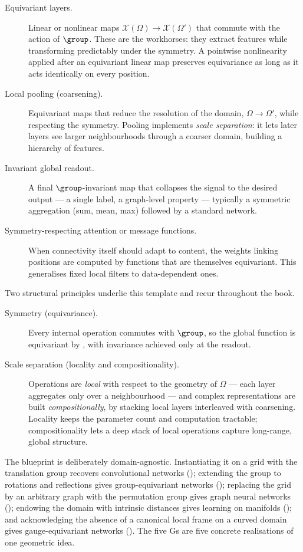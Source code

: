 \begin{description}
\item[Equivariant layers.] Linear or nonlinear maps
$\mathcal{X}(\Omega) \to \mathcal{X}(\Omega')$ that commute with the action of
$\group$. These are the workhorses: they extract features while transforming
predictably under the symmetry. A pointwise nonlinearity applied after an
equivariant linear map preserves equivariance as long as it acts identically on
every position.
\item[Local pooling (coarsening).] Equivariant maps that reduce the resolution
of the domain, $\Omega \to \Omega'$, while respecting the symmetry. Pooling
implements \emph{scale separation}: it lets later layers see larger
neighbourhoods through a coarser domain, building a hierarchy of features.
\item[Invariant global readout.] A final $\group$-invariant map that collapses
the signal to the desired output --- a single label, a graph-level property ---
typically a symmetric aggregation (sum, mean, max) followed by a standard
network.
\item[Symmetry-respecting attention or message functions.] When connectivity
itself should adapt to content, the weights linking positions are computed by
functions that are themselves equivariant. This generalises fixed local filters
to data-dependent ones.
\end{description}

Two structural principles underlie this template and recur throughout the book.

\begin{description}
\item[Symmetry (equivariance).] Every internal operation commutes with
$\group$, so the global function is equivariant by
, with invariance achieved only at the readout.
\item[Scale separation (locality and compositionality).] Operations are
\emph{local} with respect to the geometry of $\Omega$ --- each layer aggregates
only over a neighbourhood --- and complex representations are built
\emph{compositionally}, by stacking local layers interleaved with coarsening.
Locality keeps the parameter count and computation tractable; compositionality
lets a deep stack of local operations capture long-range, global structure.
\end{description}

\begin{remark}
\label{rem:priors:fivegs}
The blueprint is deliberately domain-agnostic. Instantiating it on a grid with
the translation group recovers convolutional networks ();
extending the group to rotations and reflections gives group-equivariant
networks (); replacing the grid by an arbitrary graph with the
permutation group gives graph neural networks (); endowing the
domain with intrinsic distances gives learning on manifolds
(); and acknowledging the absence of a canonical local frame
on a curved domain gives gauge-equivariant networks (). The
five Gs are five concrete realisations of one geometric idea.
\end{remark}

